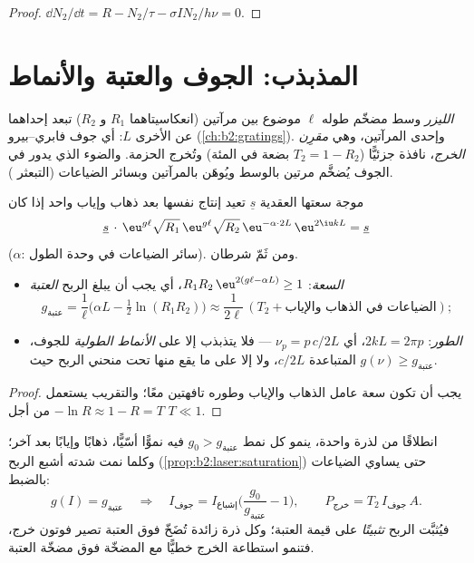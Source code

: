 \begin{proof}
$\dd N_2/\dd t = R - N_2/\tau - \sigma I N_2/h\nu = 0$.
\end{proof}

\section{المذبذب: الجوف والعتبة والأنماط}

\begin{definition}\label{def:b2:laser:cavity}
\emph{الليزر} وسط مضخّم طوله $\ell$
موضوع بين مرآتين (انعكاسيتاهما $R_1$ و $R_2$) تبعد إحداهما عن الأخرى $L$:
أي جوف فابري--بيرو (\cref{ch:b2:gratings}). وإحدى المرآتين، وهي
\emph{مقرِن الخرج}، نافذة جزئيًّا ($T_2 = 1 - R_2$ بضعة
في المئة) وتُخرج الحزمة. والضوء الذي يدور في الجوف
يُضخَّم مرتين بالوسط ويُوهَن بالمرآتين وبسائر
الضياعات (التبعثر  ).
\end{definition}

\begin{theorem}\label{thm:b2:laser:threshold}
موجة سعتها العقدية $\underline s$ تعيد إنتاج نفسها بعد ذهاب
وإياب واحد إذا كان
\[
\underline s\,\cdot\, \eu^{g\ell}\sqrt{R_1}\,\eu^{g\ell}\sqrt{R_2}\,
\eu^{-\alpha\cdot 2L}\,\eu^{2\iu kL} = \underline s
\]
($\alpha$: سائر الضياعات في وحدة الطول). ومن ثَمّ شرطان.
\begin{itemize}
\item \emph{السعة}: $R_1R_2\,\eu^{2(g\ell - \alpha L)} \ge 1$، أي يجب أن يبلغ
      الربح \emph{العتبة}
      \[
      g_{\text{عتبة}} = \frac{1}{\ell}\Big(\alpha L - \tfrac12\ln(R_1R_2)\Big)
      \approx \frac{1}{2\ell}\,(T_2 + \text{الضياعات في الذهاب والإياب}) ;
      \]
\item \emph{الطور}: $2kL = 2\pi p$، أي $\nu_p = p\,c/2L$ --- فلا يتذبذب 
      إلا على \emph{الأنماط الطولية}
      للجوف، المتباعدة $c/2L$، ولا إلا على ما يقع
      منها تحت منحني الربح حيث $g(\nu) \ge g_{\text{عتبة}}$.
\end{itemize}
\end{theorem}

\begin{proof}
يجب أن تكون سعة عامل الذهاب والإياب وطوره تافهتين معًا؛
والتقريب يستعمل $-\ln R \approx 1 - R = T$ من أجل $T \ll 1$.
\end{proof}

\begin{proposition}\label{prop:b2:laser:steady}
انطلاقًا من  لذرة واحدة، ينمو كل نمط
$g_0 > g_{\text{عتبة}}$ فيه نموًّا أسّيًّا، ذهابًا وإيابًا بعد آخر؛
وكلما نمت شدته أشبع الربح
(\cref{prop:b2:laser:saturation}) حتى يساوي الضياعات بالضبط:
\[
g(I) = g_{\text{عتبة}} \quad\Longrightarrow\quad
I_{\text{جوف}} = I_{\text{إشباع}}\Big(\frac{g_0}{g_{\text{عتبة}}} - 1\Big),
\qquad P_{\text{خرج}} = T_2\,I_{\text{جوف}}\,A .
\]
فيُثبَّت الربح \emph{تثبيتًا} على قيمة العتبة؛ وكل ذرة زائدة
تُضَخّ فوق العتبة تصير فوتون خرج، فتنمو استطاعة الخرج
خطيًّا مع المضخّة فوق مضخّة العتبة.
\end{proposition}

